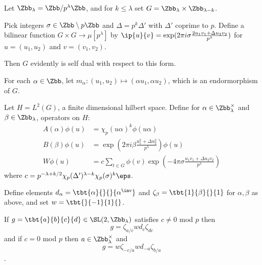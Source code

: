 Let $\Zbb_\lambda = \Zbb/p^\lambda\Zbb$, and for $k\leq \lambda$  set $G= \Zbb_\lambda \times \Zbb_{\lambda-k}$.

Pick integers $\sigma \in \Zbb\setminus p\Zbb$ and $\Delta = p^k \Delta'$ with $\Delta'$ coprime to $p$. Define a bilinear function $G\times G \to \mu[p^\lambda]$ by $\ip{u}{v} = \exp( 2\pi i \sigma \frac{2 u_1 v_1 + \Delta u_2 v_2}{p^\lambda})$ for $u=(u_1,u_2)$ and $v=(v_1,v_2)$.

Then $G$ evidently is self dual with respect to this form.

For each $\alpha \in \Zbb$, let $m_\alpha : (u_1,u_2)\mapsto (\alpha u_1,\alpha u_2)$, which is an endormorphism of $G$.

Let $H= L^2(G)$, a finite dimensional hilbert space. Define for $\alpha \in \Zbb_\lambda^\times$ and $\beta \in \Zbb_\lambda$, operators on $H$:
\begin{align}
    A(\alpha)\phi(u) & = \chi_p(u\alpha)^k\phi(u\alpha)                                                  \\
    B(\beta)\phi(u)  & =\exp( 2\pi i \beta  \frac{u_1^2 + \Delta u_2^2}{p^\lambda})\phi(u)               \\
    W\phi(u)         & = c \sum_{t\in G}\phi(v)\exp(-4\pi \sigma\frac{u_1v_1+\Delta u_2 v_2}{p^\lambda})
\end{align}
where $c =p^{-\lambda+k/2}\chi_p(\Delta')^{\lambda - k}\chi_p(\sigma)^k\eps$.

Define elements $d_\alpha = \tbt{\alpha}{}{}{\alpha^\inv}$ and $\zeta_\beta = \tbt{1}{\beta}{}{1}$ for $\alpha,\beta$ as above, and set $w = \tbt{}{-1}{1}{}$.


\begin{lemma}
    If $g=\tbt{a}{b}{c}{d} \in \SL(2,\Zbb_\lambda)$ satisfies $c\neq 0$ mod $p$ then
    \[g =\zeta_{a/c}w d_{c} \zeta_{dc}\]
    and if $c= 0$ mod $p$ then  $a \in \Zbb_\lambda^\times$ and
    \[g = w \zeta_{-c/a}wd_{-a}\zeta_{b/a}\].
\end{lemma}
